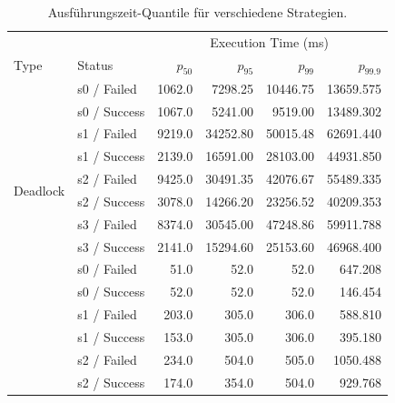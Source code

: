 \begin{table}[htbp]
	\centering
	\caption{Ausführungszeit-Quantile für verschiedene Strategien.}
	\label{tab:s-quantiles}
	\scriptsize
	\setlength{\tabcolsep}{4pt}
	\begin{tabular}{llrrrr}
		\toprule
		& & \multicolumn{4}{c}{Execution Time (ms)} \\
		Type & Status & $p_{50}$ & $p_{95}$ & $p_{99}$ & $p_{99.9}$ \\
		\midrule

		\multirow{10}{*}{Deadlock}
		& s0 / Failed
		& 1062.0 & 7298.25 & 10446.75 & 13659.575 \\
		& s0 / Success
		& 1067.0 & 5241.00 & 9519.00 & 13489.302 \\

		& s1 / Failed
		& 9219.0 & 34252.80 & 50015.48 & 62691.440 \\
		& s1 / Success
		& 2139.0 & 16591.00 & 28103.00 & 44931.850 \\

		& s2 / Failed
		& 9425.0 & 30491.35 & 42076.67 & 55489.335 \\
		& s2 / Success
		& 3078.0 & 14266.20 & 23256.52 & 40209.353 \\

		& s3 / Failed
		& 8374.0 & 30545.00 & 47248.86 & 59911.788 \\
		& s3 / Success
		& 2141.0 & 15294.60 & 25153.60 & 46968.400 \\

		\midrule

		\multirow{10}{*}{Serialization}
		& s0 / Failed
		& 51.0 & 52.0 & 52.0 & 647.208 \\
		& s0 / Success
		& 52.0 & 52.0 & 52.0 & 146.454 \\

		& s1 / Failed
		& 203.0 & 305.0 & 306.0 & 588.810 \\
		& s1 / Success
		& 153.0 & 305.0 & 306.0 & 395.180 \\

		& s2 / Failed
		& 234.0 & 504.0 & 505.0 & 1050.488 \\
		& s2 / Success
		& 174.0 & 354.0 & 504.0 & 929.768 \\


\end{tabular}
\end{table}
